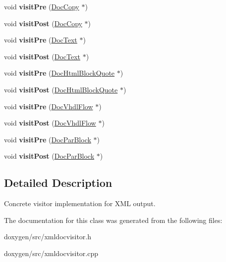 \begin{DoxyCompactItemize}
\item 
\mbox{\label{class_xml_doc_visitor_a0d7058ee3019ed4d408f1007282ad372}} 
void {\bfseries visit\+Pre} (\mbox{\hyperlink{class_doc_copy}{Doc\+Copy}} $\ast$)
\item 
\mbox{\label{class_xml_doc_visitor_a4a7197cd159863b7e337d3432b41d8b8}} 
void {\bfseries visit\+Post} (\mbox{\hyperlink{class_doc_copy}{Doc\+Copy}} $\ast$)
\item 
\mbox{\label{class_xml_doc_visitor_a7bd42db019ef1160b2e109a13d3c38ff}} 
void {\bfseries visit\+Pre} (\mbox{\hyperlink{class_doc_text}{Doc\+Text}} $\ast$)
\item 
\mbox{\label{class_xml_doc_visitor_a41a17055f4bda0c651417ae0f454aadf}} 
void {\bfseries visit\+Post} (\mbox{\hyperlink{class_doc_text}{Doc\+Text}} $\ast$)
\item 
\mbox{\label{class_xml_doc_visitor_a78ffc45bc2d146fdace63240f8c1dbf8}} 
void {\bfseries visit\+Pre} (\mbox{\hyperlink{class_doc_html_block_quote}{Doc\+Html\+Block\+Quote}} $\ast$)
\item 
\mbox{\label{class_xml_doc_visitor_a621e8d7882167c3d45b7da8e605a9e10}} 
void {\bfseries visit\+Post} (\mbox{\hyperlink{class_doc_html_block_quote}{Doc\+Html\+Block\+Quote}} $\ast$)
\item 
\mbox{\label{class_xml_doc_visitor_af753298e31efde07690eba68b1ac77b4}} 
void {\bfseries visit\+Pre} (\mbox{\hyperlink{class_doc_vhdl_flow}{Doc\+Vhdl\+Flow}} $\ast$)
\item 
\mbox{\label{class_xml_doc_visitor_a84e7b0e6969242cecb24d9b39b8cbdd2}} 
void {\bfseries visit\+Post} (\mbox{\hyperlink{class_doc_vhdl_flow}{Doc\+Vhdl\+Flow}} $\ast$)
\item 
\mbox{\label{class_xml_doc_visitor_a1e600cad83ff588c8fc074da36f29af2}} 
void {\bfseries visit\+Pre} (\mbox{\hyperlink{class_doc_par_block}{Doc\+Par\+Block}} $\ast$)
\item 
\mbox{\label{class_xml_doc_visitor_a0f455554b1e7339d196056212bab4959}} 
void {\bfseries visit\+Post} (\mbox{\hyperlink{class_doc_par_block}{Doc\+Par\+Block}} $\ast$)
\end{DoxyCompactItemize}


\subsection{Detailed Description}
Concrete visitor implementation for X\+ML output. 

The documentation for this class was generated from the following files\+:\begin{DoxyCompactItemize}
\item 
doxygen/src/xmldocvisitor.\+h\item 
doxygen/src/xmldocvisitor.\+cpp\end{DoxyCompactItemize}
